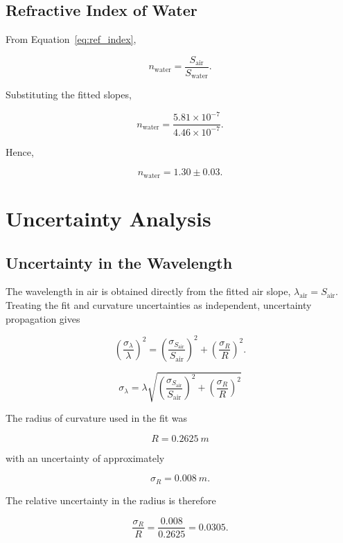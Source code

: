 \documentclass[12pt,a4paper]{article}
\begin{document}
\subsection{Refractive Index of Water}

From Equation~\ref{eq:ref_index},

\[
n_{\mathrm{water}}
=\frac{S_{\mathrm{air}}}{S_{\mathrm{water}}}.
\]

Substituting the fitted slopes,

\[
n_{\mathrm{water}}
=
\frac{5.81\times10^{-7}}
{4.46\times10^{-7}}.
\]

Hence,

\[
\boxed{n_{\mathrm{water}}=1.30\pm0.03}.
\]

\newpage

\section{Uncertainty Analysis}

\subsection{Uncertainty in the Wavelength}

The wavelength in air is obtained directly from the fitted air slope, $\lambda_{\mathrm{air}}=S_{\mathrm{air}}$. Treating the fit and curvature uncertainties as independent, uncertainty propagation gives

\[
\left(\frac{\sigma_\lambda}{\lambda}\right)^2
=
\left(\frac{\sigma_{S_{\mathrm{air}}}}
{S_{\mathrm{air}}}\right)^2
+
\left(\frac{\sigma_R}{R}\right)^2.
\]

\begin{equation}
    \sigma_{\lambda} = \lambda \sqrt{\left(\frac{\sigma_{S_{\mathrm{air}}}}{S_{\mathrm{air}}}\right)^2 + \left(\frac{\sigma_R}{R}\right)^2}
    \label{eq:uncertainty_lambda}
\end{equation}

The radius of curvature used in the fit was

\[
R=\SI{0.2625}{m}
\]

with an uncertainty of approximately

\[
\sigma_R=\SI{0.008}{m}.
\]

The relative uncertainty in the radius
is therefore

\[
\frac{\sigma_R}{R}
=
\frac{0.008}{0.2625}
=0.0305.
\]
\end{document}
